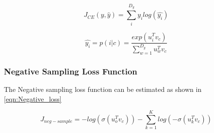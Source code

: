 \begin{equation}
J_{CE}(y,\hat{y})=\sum_{i}^{D_y}y_i log(\hat{y_i})
\label{eqn:Cross_Entropy}
\end{equation}

\begin{equation}
\hat{y_i}=p(i|c)=\frac{exp(u_i^T v_c )}{\sum_{w=1}^{D_y}u_w^T v_c}
\label{y_hat}
\end{equation}

\subsubsection{Negative Sampling Loss Function}
The Negative sampling loss function can be estimated as shown in \ref{eqn:Negative_loss}

\begin{equation}
J_{neg-sample}=-log(\sigma(u_o^T v_c))-\sum_{k=1}^{K} log (-\sigma(u_k^T v_c))
\label{eqn:Negative_loss}
\end{equation}





